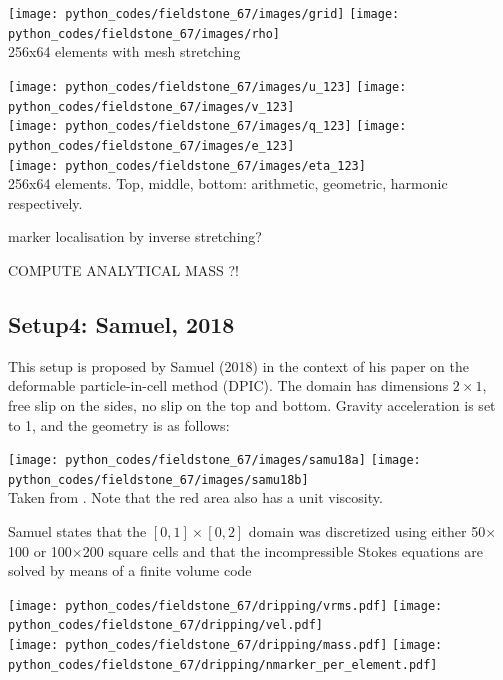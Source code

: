 \begin{center}
\texttt{[image: python\_codes/fieldstone\_67/images/grid]}
\texttt{[image: python\_codes/fieldstone\_67/images/rho]}\\
{\captionfont 256x64 elements with mesh stretching}
\end{center}


\begin{center}
\texttt{[image: python\_codes/fieldstone\_67/images/u\_123]}
\texttt{[image: python\_codes/fieldstone\_67/images/v\_123]}\\
\texttt{[image: python\_codes/fieldstone\_67/images/q\_123]}
\texttt{[image: python\_codes/fieldstone\_67/images/e\_123]}\\
\texttt{[image: python\_codes/fieldstone\_67/images/eta\_123]}\\
{\captionfont 256x64 elements. Top, middle, bottom: arithmetic, geometric, harmonic respectively.}
\end{center}


marker localisation by inverse stretching?

COMPUTE ANALYTICAL MASS ?!

\newpage
\subsection*{Setup4: Samuel, 2018}

This setup is proposed by Samuel (2018) \cite{samu18} in the context of his paper 
on the deformable particle-in-cell method (DPIC).
The domain has dimensions $2 \times 1$, free slip on the sides, no slip on the top and bottom. 
Gravity acceleration is set to 1, and the geometry is as follows:

\begin{center}
\texttt{[image: python\_codes/fieldstone\_67/images/samu18a]}
\texttt{[image: python\_codes/fieldstone\_67/images/samu18b]}\\
{\captionfont Taken from \cite{samu18}. Note that the red area also has a unit viscosity.}
\end{center}

Samuel states that the $[0,1] \times [0,2]$ domain was discretized using either 50$\times$100 
or 100$\times$200 square cells and that the incompressible Stokes equations are solved by means 
of a finite volume code \cite{saev10,samu12}


\begin{center}
\texttt{[image: python\_codes/fieldstone\_67/dripping/vrms.pdf]}
\texttt{[image: python\_codes/fieldstone\_67/dripping/vel.pdf]}\\
\texttt{[image: python\_codes/fieldstone\_67/dripping/mass.pdf]}
\texttt{[image: python\_codes/fieldstone\_67/dripping/nmarker\_per\_element.pdf]}
\end{center}

